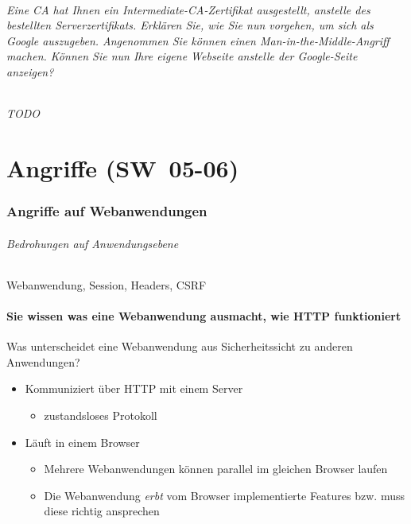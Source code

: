 \documentclass[10pt,a4paper]{article}
\begin{document}
\paragraph*{Eine CA hat Ihnen ein Intermediate-CA-Zertifikat ausgestellt, anstelle des bestellten Serverzertifikats. Erklären Sie, wie Sie nun vorgehen, um sich als Google auszugeben. Angenommen Sie können einen Man-in-the-Middle-Angriff machen. Können Sie nun Ihre eigene Webseite anstelle der Google-Seite anzeigen?}
\paragraph*{TODO}


\part{Angriffe (SW~05-06)}
\section{Angriffe auf Webanwendungen}

\paragraph*{Bedrohungen auf Anwendungsebene}Webanwendung, Session, Headers, CSRF

\subsection*{Sie wissen was eine Webanwendung ausmacht, wie HTTP funktioniert}
Was unterscheidet eine Webanwendung aus Sicherheitssicht zu anderen Anwendungen?
\begin{itemize}[noitemsep,topsep=0pt,leftmargin=*]
    \item Kommuniziert über HTTP mit einem Server
    \begin{itemize}[noitemsep,topsep=0pt,leftmargin=*]
        \item zustandsloses Protokoll
    \end{itemize}
    \item Läuft in einem Browser
    \begin{itemize}[noitemsep,topsep=0pt,leftmargin=*]
        \item Mehrere Webanwendungen können parallel im gleichen Browser laufen
        \item Die Webanwendung \textsl{erbt} vom Browser implementierte Features
        bzw. muss diese richtig ansprechen
    \end{itemize}
\end{itemize}
\end{document}
